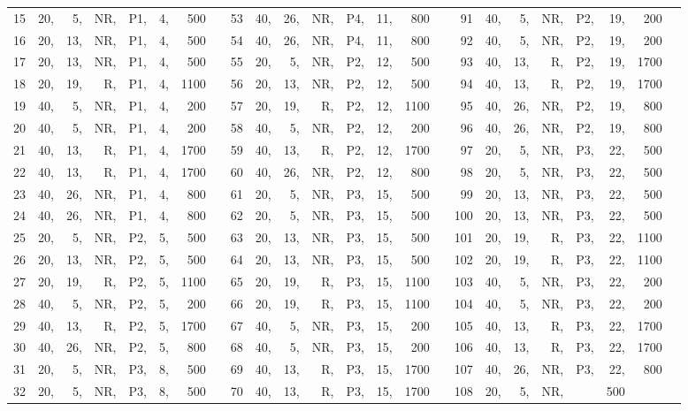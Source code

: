 \begin{table}
\begin{center}
\begin{scriptsize}
\begin{tabular}{*{3}{@{\hskip15pt}r|*{5}{r@{\hskip3pt}}rc}}
  15&20,& 5,&NR,&P1,& 4,& 500&  &     53&40,&26,&NR,&P4,&11,& 800&   &     91&40,& 5,&NR,&P2,&19,& 200\\
  16&20,&13,&NR,&P1,& 4,& 500&  &     54&40,&26,&NR,&P4,&11,& 800&   &     92&40,& 5,&NR,&P2,&19,& 200\\
  17&20,&13,&NR,&P1,& 4,& 500&  &     55&20,& 5,&NR,&P2,&12,& 500&   &     93&40,&13,& R,&P2,&19,&1700\\
  18&20,&19,& R,&P1,& 4,&1100&  &     56&20,&13,&NR,&P2,&12,& 500&   &     94&40,&13,& R,&P2,&19,&1700\\
  19&40,& 5,&NR,&P1,& 4,& 200&  &     57&20,&19,& R,&P2,&12,&1100&   &     95&40,&26,&NR,&P2,&19,& 800\\
  20&40,& 5,&NR,&P1,& 4,& 200&  &     58&40,& 5,&NR,&P2,&12,& 200&   &     96&40,&26,&NR,&P2,&19,& 800\\
  21&40,&13,& R,&P1,& 4,&1700&  &     59&40,&13,& R,&P2,&12,&1700&   &     97&20,& 5,&NR,&P3,&22,& 500\\
  22&40,&13,& R,&P1,& 4,&1700&  &     60&40,&26,&NR,&P2,&12,& 800&   &     98&20,& 5,&NR,&P3,&22,& 500\\
  23&40,&26,&NR,&P1,& 4,& 800&  &     61&20,& 5,&NR,&P3,&15,& 500&   &     99&20,&13,&NR,&P3,&22,& 500\\
  24&40,&26,&NR,&P1,& 4,& 800&  &     62&20,& 5,&NR,&P3,&15,& 500&   &    100&20,&13,&NR,&P3,&22,& 500\\
  25&20,& 5,&NR,&P2,& 5,& 500&  &     63&20,&13,&NR,&P3,&15,& 500&   &    101&20,&19,& R,&P3,&22,&1100\\
  26&20,&13,&NR,&P2,& 5,& 500&  &     64&20,&13,&NR,&P3,&15,& 500&   &    102&20,&19,& R,&P3,&22,&1100\\
  27&20,&19,& R,&P2,& 5,&1100&  &     65&20,&19,& R,&P3,&15,&1100&   &    103&40,& 5,&NR,&P3,&22,& 200\\
  28&40,& 5,&NR,&P2,& 5,& 200&  &     66&20,&19,& R,&P3,&15,&1100&   &    104&40,& 5,&NR,&P3,&22,& 200\\
  29&40,&13,& R,&P2,& 5,&1700&  &     67&40,& 5,&NR,&P3,&15,& 200&   &    105&40,&13,& R,&P3,&22,&1700\\
  30&40,&26,&NR,&P2,& 5,& 800&  &     68&40,& 5,&NR,&P3,&15,& 200&   &    106&40,&13,& R,&P3,&22,&1700\\
  31&20,& 5,&NR,&P3,& 8,& 500&  &     69&40,&13,& R,&P3,&15,&1700&   &    107&40,&26,&NR,&P3,&22,& 800\\
  32&20,& 5,&NR,&P3,& 8,& 500&  &     70&40,&13,& R,&P3,&15,&1700&   &    108&20,& 5,&NR,&& 500\\

\end{tabular}
\end{scriptsize}
\end{center}
\end{table}
